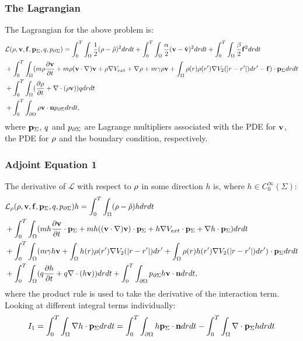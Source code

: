 \subsubsection*{The Lagrangian}
The Lagrangian for the above problem is:
\begin{align*}
&\mathcal{L}(\rho,\mathbf{v},\mathbf{f},\mathbf{p}_\Sigma,q,p_{\partial \Sigma}) = \int_0^T \int_\Omega  \frac{1}{2}(\rho - \hat {\rho})^2 drdt +\int_0^T \int_\Omega  \frac{\alpha}{2}(\mathbf{v} - \hat {\mathbf{v}})^2 drdt +\int_0^T \int_\Omega  \frac{\beta}{2}\mathbf{f}^2 drdt\\
&+ \int_0^T \int_\Omega (m \rho \frac{\partial \mathbf{v}}{\partial t} + m \rho (\mathbf{v} \cdot \nabla)\mathbf{v} + \rho \nabla V_{ext} + \nabla \rho + m\gamma \rho \mathbf{v} +\int_\Omega \rho(r) \rho(r') \nabla V_2(|r-r'|)dr'-\mathbf{f}) \cdot \mathbf{p}_\Sigma dr dt\\
& + \int_0^T \int_\Omega (\frac{\partial \rho}{\partial t} + \nabla \cdot (\rho \mathbf{v})) q dr dt\\ 
& +\int_0^T \int_{\partial\Omega} \rho \mathbf{v} \cdot \mathbf{n} p_{\partial \Sigma} dr dt,
\end{align*}
where $\mathbf{p}_\Sigma$, $q$ and $p_{\partial \Sigma}$ are Lagrange multipliers associated with the PDE for $\mathbf{v}$, the PDE for $\rho$ and the boundary condition, respectively.
\subsubsection*{Adjoint Equation 1}

The derivative of $\mathcal{L}$ with respect to $\rho$ in some direction $h$ is, where ${h} \in C_0^\infty(\Sigma) $:
\begin{align*}
&\mathcal{L}_\rho(\rho,\mathbf{v},\mathbf{f},\mathbf{p}_\Sigma,q,p_{\partial \Sigma})h = \int_0^T \int_\Omega  (\rho - \hat {\rho})h drdt \\
&+ \int_0^T \int_\Omega (m h \frac{\partial \mathbf{v}}{\partial t}\cdot \mathbf{p}_\Sigma + m h( (\mathbf{v} \cdot \nabla)\mathbf{v} )\cdot \mathbf{p}_\Sigma+ h\nabla V_{ext}\cdot \mathbf{p}_\Sigma + \nabla h\cdot \mathbf{p}_\Sigma)  dr dt\\
&+ \int_0^T \int_\Omega (m\gamma h \mathbf{v} +\int_\Omega h(r) \rho(r') \nabla V_2(|r-r'|)dr'+\int_\Omega \rho(r) h(r') \nabla V_2(|r-r'|)dr') \cdot \mathbf{p}_\Sigma dr dt\\
& + \int_0^T \int_\Omega (q\frac{\partial h}{\partial t} + q\nabla \cdot (h \mathbf{v}))  dr dt +\int_0^T \int_{\partial\Omega} p_{\partial \Sigma} h\mathbf{v} \cdot \mathbf{n}  dr dt,
\end{align*}
where the product rule is used to take the derivative of the interaction term. Looking at different integral terms individually:
\begin{align*}
I_1= \int_0^T \int_\Omega \nabla h\cdot \mathbf{p}_\Sigma dr dt = \int_0^T \int_{\partial \Omega} h \mathbf{p}_\Sigma \cdot \mathbf{n} dr dt - \int_0^T \int_{\Omega} \nabla\cdot \mathbf{p}_\Sigma h dr dt
\end{align*}
 
